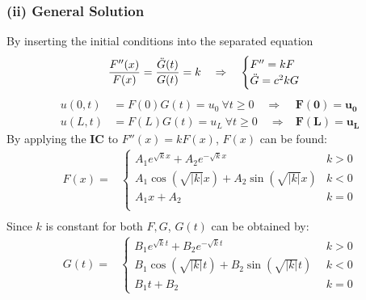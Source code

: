 \subsubsection{(ii) General Solution}
By inserting the initial conditions into the separated equation
\begin{equation*}
    \frac{F^{\prime\prime}(x)}{F(x)}=\frac{\ddot{G}(t)}{G(t)}=k\hspace*{10pt}\Rightarrow\hspace*{10pt}
    \begin{cases} 
        F''=kF\\
        \ddot{G}=c^2kG
    \end{cases}
\end{equation*}
\begin{align*}
    u(0,t)&=F(0)G(t)=u_0\mathrm{~}\forall t\geq0\quad\Rightarrow&\mathbf{F(0)}=\mathbf{u_0}\\
    u(L,t)&=F(L)G(t)=u_L\mathrm{~}\forall t\geq0\quad\Rightarrow&\mathbf{F(L)}=\mathbf{u_L}
\end{align*}
By applying the \textbf{IC} to $F''(x)=kF(x)$, $F(x)$ can be found:
\begin{align*}
    F(x)=&
    \begin{cases}
        A_1e^{\sqrt{k}x}+A_2e^{-\sqrt{k}x}&k>0\\
        A_1\cos(\sqrt{|k|}x)+A_2\sin(\sqrt{|k|}x)&k<0\\
        A_1x+A_2&k=0\\
    \end{cases}\\
\end{align*}
Since $k$ is constant for both $F,G$, $G(t)$ can be obtained by:
\begin{align*}
    G(t)=&
    \begin{cases}
        B_1e^{\sqrt{k}t}+B_2e^{-\sqrt{k}t}&\;\,k>0\\
        B_1\cos(\sqrt{|k|}t)+B_2\sin(\sqrt{|k|}t)&\;\,k<0\\
        B_1t+B_2&\;\,k=0
    \end{cases}
\end{align*}
%
%
